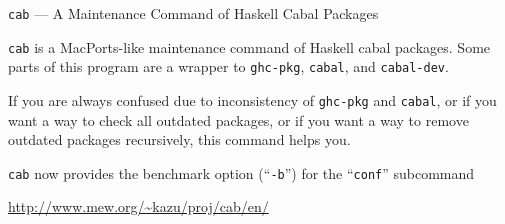 \begin{hcarentry}[updated]{{\tt cab} --- A Maintenance Command of Haskell Cabal Packages}
\makeheader

{\tt cab} is a MacPorts-like maintenance command of Haskell cabal packages. Some parts of this program are a wrapper to {\tt ghc-pkg}, {\tt cabal}, and {\tt cabal-dev}.

If you are always confused due to inconsistency of {\tt ghc-pkg} and {\tt cabal}, or if you want a way to check all outdated packages, or if you want a way to remove outdated packages recursively, this command helps you.

{\tt cab} now provides the benchmark option (``{\tt -b}'') for the ``{\tt conf}'' subcommand

\FurtherReading
  \url{http://www.mew.org/~kazu/proj/cab/en/}
\end{hcarentry}
